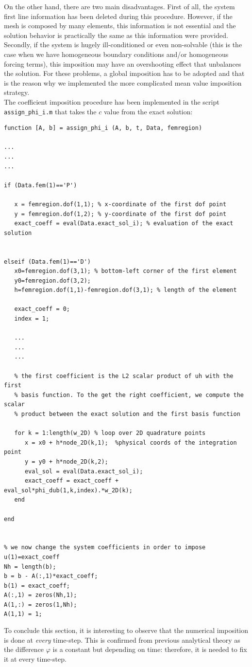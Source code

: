 \documentclass[a4paper,11pt]{article}
\begin{document}
\noindent On the other hand, there are two main disadvantages. First of all, the system first line information has been deleted during this procedure. However, if the mesh is composed by many elements, this information is not essential and the solution behavior is practically the same as this information were provided. \\
Secondly, if the system is hugely ill-conditioned or even non-solvable (this is the case when we have homogeneous boundary conditions and/or homogeneous forcing terms), this imposition may have an overshooting effect that unbalances the solution. For these problems, a global imposition has to be adopted and that is the reason why we implemented the more complicated mean value imposition strategy.\\

\noindent The coefficient imposition procedure has been implemented in the script \texttt{assign\_phi\_i.m} that takes the $c$ value from the exact solution: \\

\begin{verbatim}
function [A, b] = assign_phi_i (A, b, t, Data, femregion)

...
...
...

if (Data.fem(1)=='P')

   x = femregion.dof(1,1); % x-coordinate of the first dof point
   y = femregion.dof(1,2); % y-coordinate of the first dof point
   exact_coeff = eval(Data.exact_sol_i); % evaluation of the exact solution


elseif (Data.fem(1)=='D')
   x0=femregion.dof(3,1); % bottom-left corner of the first element
   y0=femregion.dof(3,2);
   h=femregion.dof(1,1)-femregion.dof(3,1); % length of the element

   exact_coeff = 0;
   index = 1;
   
   ...
   ...
   ...

   % the first coefficient is the L2 scalar product of uh with the first
   % basis function. To the get the right coefficient, we compute the scalar 
   % product between the exact solution and the first basis function
   
   for k = 1:length(w_2D) % loop over 2D quadrature points
      x = x0 + h*node_2D(k,1);  %physical coords of the integration point
      y = y0 + h*node_2D(k,2);
      eval_sol = eval(Data.exact_sol_i);
      exact_coeff = exact_coeff + eval_sol*phi_dub(1,k,index).*w_2D(k);
   end

end


% we now change the system coefficients in order to impose u(1)=exact_coeff
Nh = length(b);
b = b - A(:,1)*exact_coeff;
b(1) = exact_coeff;  
A(:,1) = zeros(Nh,1);
A(1,:) = zeros(1,Nh);
A(1,1) = 1;

\end{verbatim}
\noindent To conclude this section, it is interesting to observe that the numerical imposition is done at \emph{every} time-step. This is confirmed from previous analytical theory as the difference $\varphi$ is a constant but depending on time: therefore, it is needed to fix it at every time-step.
\end{document}
